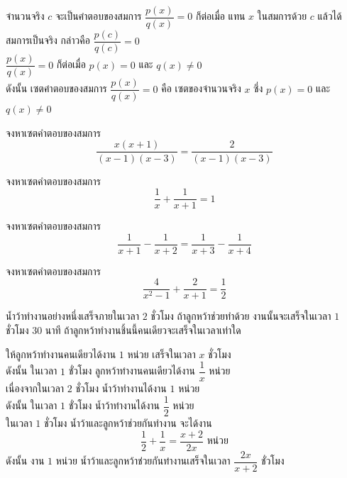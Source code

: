\begin{conceptbox}
	จำนวนจริง $c$ จะเป็นคำตอบของสมการ $\dfrac{p(x)}{q(x)} = 0$ ก็ต่อเมื่อ แทน $x$ ในสมการด้วย $c$ แล้วได้สมการเป็นจริง กล่าวคือ $\dfrac{p(c)}{q(c)} = 0$
	\\[0.5em]
\observation $\dfrac{p(x)}{q(x)} = 0$ ก็ต่อเมื่อ $p(x) = 0$ และ $q(x) \neq 0$
\\[0.5em]
	ดังนั้น เซตคำตอบของสมการ $\dfrac{p(x)}{q(x)} = 0$ คือ เซตของจำนวนจริง $x$ ซึ่ง $p(x) = 0$ และ $q(x) \neq 0$
\end{conceptbox}

\begin{examplebox}
	จงหาเซตคำตอบของสมการ 
	$$\dfrac{x(x+1)}{(x-1)(x-3)} = \dfrac{2}{(x-1)(x-3)}$$
\end{examplebox}   
\solution
\newpage

\begin{examplebox}
	จงหาเซตคำตอบของสมการ 
	$$\dfrac{1}{x} + \dfrac{1}{x+1} = 1$$
\end{examplebox}  
		\solution
\newpage
		
		\begin{examplebox}
			จงหาเซตคำตอบของสมการ 
			$$\dfrac{1}{x+1} - \dfrac{1}{x+2} = \dfrac{1}{x+3} - \dfrac{1}{x+4}$$
		\end{examplebox}     
		\solution
\newpage
		
		\begin{examplebox}
			จงหาเซตคำตอบของสมการ 
			$$\dfrac{4}{x^2-1} + \dfrac{2}{x+1} = \dfrac{1}{2}$$
		\end{examplebox}     
		\solution
\newpage
		
		\begin{examplebox}
			น้ำว้าทำงานอย่างหนึ่งเสร็จภายในเวลา $2$ ชั่วโมง ถ้าลูกหว้าช่วยทำด้วย งานนั้นจะเสร็จในเวลา $1$ ชั่วโมง $30$ นาที ถ้าลูกหว้าทำงานชิ้นนี้คนเดียวจะเสร็จในเวลาเท่าใด
		\end{examplebox}     
	\solution ให้ลูกหว้าทำงานคนเดียวได้งาน $1$ หน่วย เสร็จในเวลา $x$ ชั่วโมง \\
	ดังนั้น ในเวลา $1$ ชั่วโมง ลูกหว้าทำงานคนเดียวได้งาน $\dfrac{1}{x}$ หน่วย \\[6pt]
	เนื่องจากในเวลา $2$ ชั่วโมง น้ำว้าทำงานได้งาน $1$ หน่วย \\
	ดังนั้น ในเวลา $1$ ชั่วโมง น้ำว้าทำงานได้งาน $\dfrac{1}{2}$ หน่วย \\[6pt]
	ในเวลา $1$ ชั่วโมง น้ำว้าและลูกหว้าช่วยกันทำงาน จะได้งาน
	\[ \dfrac{1}{2} + \dfrac{1}{x} = \dfrac{x+2}{2x} \text{ หน่วย} \]
	ดังนั้น งาน $1$ หน่วย น้ำว้าและลูกหว้าช่วยกันทำงานเสร็จในเวลา $\dfrac{2x}{x+2}$ ชั่วโมง 
	
